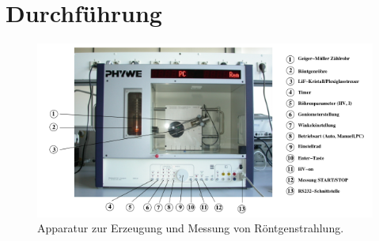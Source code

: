 \section{Durchführung}
\label{sec:Durchführung}
\begin{figure}[H]
    \centering
    \includegraphics[width=\textwidth]{images/aufbau.PNG}
    \caption{Apparatur zur Erzeugung und Messung von Röntgenstrahlung. \cite{603}}
    \label{fig:aufbau}
\end{figure}